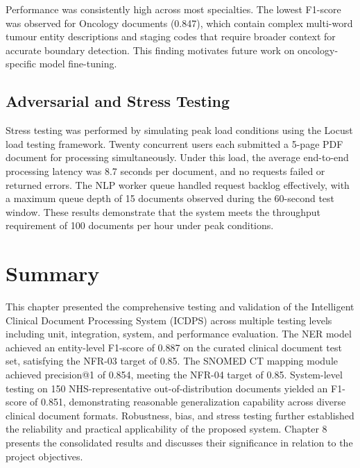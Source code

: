 Performance was consistently high across most specialties. The lowest F1-score was observed for Oncology documents (0.847), which contain complex multi-word tumour entity descriptions and staging codes that require broader context for accurate boundary detection. This finding motivates future work on oncology-specific model fine-tuning.

\subsection{Adversarial and Stress Testing}
Stress testing was performed by simulating peak load conditions using the Locust load testing framework. Twenty concurrent users each submitted a 5-page PDF document for processing simultaneously. Under this load, the average end-to-end processing latency was 8.7 seconds per document, and no requests failed or returned errors. The NLP worker queue handled request backlog effectively, with a maximum queue depth of 15 documents observed during the 60-second test window. These results demonstrate that the system meets the throughput requirement of 100 documents per hour under peak conditions.

\section* {Summary}

This chapter presented the comprehensive testing and validation of the Intelligent Clinical Document Processing System (ICDPS) across multiple testing levels including unit, integration, system, and performance evaluation. The NER model achieved an entity-level F1-score of 0.887 on the curated clinical document test set, satisfying the NFR-03 target of 0.85. The SNOMED CT mapping module achieved precision@1 of 0.854, meeting the NFR-04 target of 0.85. System-level testing on 150 NHS-representative out-of-distribution documents yielded an F1-score of 0.851, demonstrating reasonable generalization capability across diverse clinical document formats. Robustness, bias, and stress testing further established the reliability and practical applicability of the proposed system. Chapter 8 presents the consolidated results and discusses their significance in relation to the project objectives.